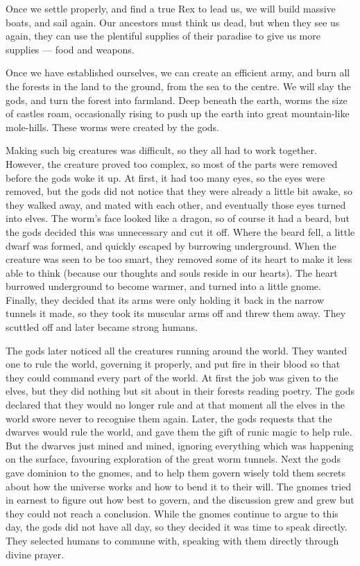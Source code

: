 \begin{exampletext}
  Once we settle properly, and find a true Rex to lead us, we will build massive boats, and sail again.
  Our ancestors must think us dead, but when they see us again, they can use the plentiful supplies of their paradise to give us more supplies --- food and weapons.

  Once we have established ourselves, we can create an efficient army, and burn all the forests in the land to the ground, from the sea to the centre.
  We will slay the gods, and turn the forest into farmland.
\else
  \noindent
  Deep beneath the earth, worms the size of castles roam, occasionally rising to push up the earth into great mountain-like mole-hills.
  These worms were created by the gods.

  Making such big creatures was difficult, so they all had to work together.
  However, the creature proved too complex, so most of the parts were removed before the gods woke it up.
  At first, it had too many eyes, so the eyes were removed, but the gods did not notice that they were already a little bit awake, so they walked away, and mated with each other, and eventually those eyes turned into elves.
  The worm's face looked like a dragon, so of course it had a beard, but the gods decided this was unnecessary and cut it off.
  Where the beard fell, a little dwarf was formed, and quickly escaped by burrowing underground.
  When the creature was seen to be too smart, they removed some of its heart to make it less able to think (because our thoughts and souls reside in our hearts).
  The heart burrowed underground to become warmer, and turned into a little gnome.
  Finally, they decided that its arms were only holding it back in the narrow tunnels it made, so they took its muscular arms off and threw them away.
  They scuttled off and later became strong humans.

  The gods later noticed all the creatures running around the world.
  They wanted one to rule the world, governing it properly, and put fire in their blood so that they could command every part of the world.
  At first the job was given to the elves, but they did nothing but sit about in their forests reading poetry.
  The gods declared that they would no longer rule and at that moment all the elves in the world swore never to recognise them again.
  Later, the gods requests that the dwarves would rule the world, and gave them the gift of runic magic to help rule.
  But the dwarves just mined and mined, ignoring everything which was happening on the surface, favouring exploration of the great worm tunnels.
  Next the gods gave dominion to the gnomes, and to help them govern wisely told them secrets about how the universe works and how to bend it to their will.
  The gnomes tried in earnest to figure out how best to govern, and the discussion grew and grew but they could not reach a conclusion.
  While the gnomes continue to argue to this day, the gods did not have all day, so they decided it was time to speak directly.
  They selected humans to commune with, speaking with them directly through divine prayer.


\end{exampletext}
